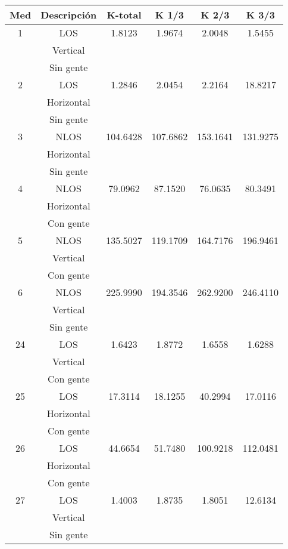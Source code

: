 \documentclass[12pt]{article}
\begin{document}
\begin{center}
	\begin{tabular}{| c | c | c | c | c | c |} \hline
Med & Descripción & K-total & K 1/3 & K 2/3 & K 3/3 \\ \hline
1	& LOS		&	1.8123  &  1.9674 	&  2.0048  	&  1.5455 \\
	& Vertical	&			&			&			&			\\
	& Sin gente &			&			&			&			\\ \hline
2	& LOS 		&	1.2846  &  2.0454   &  2.2164   & 18.8217	\\
	& Horizontal&			&			&			&			\\
	& Sin gente &			&			&			&			\\ \hline
3	& NLOS		& 104.6428  & 107.6862  & 153.1641  & 131.9275	\\
	& Horizontal&			&			&			&			\\
	& Sin gente	&			&			&			&			\\ \hline
4	& NLOS		& 79.0962   & 87.1520   &  76.0635  & 80.3491	\\ 
	& Horizontal&			&			&			&			\\
	& Con gente	&			&			&			&			\\ \hline
5	& NLOS		& 135.5027  &119.1709  	& 164.7176  & 196.9461	\\
	& Vertical	&			&			&			&			\\
	& Con gente	&			&			&			&			\\ \hline
6	& NLOS		& 225.9990  & 194.3546  & 262.9200  & 246.4110	\\
	& Vertical	&			&			&			&			\\ 
	& Sin gente	&			&			&			&			\\ \hline
24	& LOS		&  1.6423   & 1.8772    & 1.6558    & 1.6288	\\ 
	& Vertical	&			&			&			&			\\
	& Con gente	&			&			&			&			\\ \hline
25	& LOS		& 17.3114   & 18.1255   & 40.2994   & 17.0116	\\ 
	& Horizontal&			&			&			&			\\
	& Con gente	&			&			&			&			\\ \hline
26	& LOS 		& 44.6654   & 51.7480   & 100.9218  & 112.0481	\\ 
	& Horizontal&			&			&			&			\\
	& Con gente	&			&			&			&			\\ \hline
27	& LOS		& 1.4003    & 1.8735    & 1.8051    & 12.6134	\\
	& Vertical	&			&			&			&			\\
	& Sin gente	&			&			&			&			\\ \hline
	\end{tabular}
\end{center}
\normalsize
\end{document}
